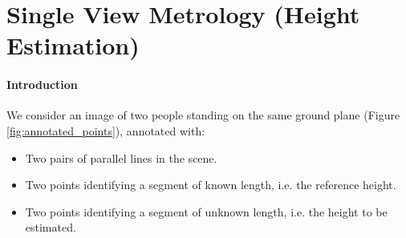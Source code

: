 \section{Single View Metrology (Height Estimation)}

\paragraph{Introduction} We consider an image of two people standing on the same ground plane (Figure \ref{fig:annotated_points}), annotated with:

\begin{itemize}
    \item Two pairs of parallel lines in the scene.
    \item Two points identifying a segment of known length, i.e. the reference height. 
    \item Two points identifying a segment of unknown length, i.e. the height to be estimated.
\end{itemize}

